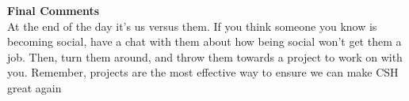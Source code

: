 \documentclass[10pt]{extarticle} %
\begin{document}
\begin{minipage}[t]{.61\linewidth}
\textbf{Final Comments} \\
At the end of the day it’s us versus them. If you think someone you know is becoming social, have a chat with them about how being social won’t get them a job. Then, turn them around, and throw them towards a project to work on with you. Remember, projects are the most effective way to ensure we can make CSH great again



\end{minipage} %

\end{document}
